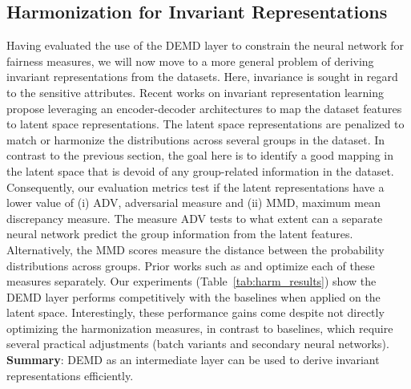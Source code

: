 \subsection{Harmonization for Invariant Representations}
Having evaluated the use of the DEMD layer to constrain the neural network for  fairness measures, we will now move to a more general problem of deriving invariant representations from the datasets. Here, invariance is sought in regard to the sensitive attributes. Recent works \citep{equivar} on invariant representation learning propose leveraging an encoder-decoder architectures to map the dataset features to latent space representations. The latent space representations are penalized to match or harmonize the distributions across several groups in the dataset. In contrast to the previous section, the goal here is to identify a good mapping in the latent space that is devoid of any group-related information in the dataset.  Consequently, our evaluation metrics test if the latent representations have a lower value of (i) ADV, adversarial measure and (ii) MMD, maximum mean discrepancy measure. The measure ADV tests to what extent can a separate neural network predict the group information from the latent features. Alternatively, the MMD scores measure the distance between the probability distributions across groups. Prior works such as \cite{zemel} and \cite{cai} optimize each of these measures separately. Our experiments (Table~\ref{tab:harm_results}) show the DEMD layer performs competitively with the baselines when applied on the latent space. Interestingly, these performance gains come despite not directly optimizing the harmonization measures, in contrast to baselines, which require several practical adjustments (batch variants and secondary neural networks).
\textbf{Summary}: DEMD as an intermediate layer can be used to derive invariant representations efficiently.
